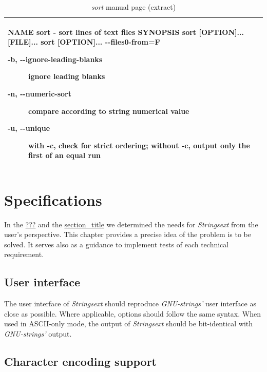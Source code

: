 \begin{longtable}[]{@{}l@{}}
\caption{\emph{sort} manual page (extract)}\tabularnewline
\toprule
\begin{minipage}[t]{0.97\columnwidth}\raggedright\strut
NAME sort - sort lines of text files SYNOPSIS sort {[}OPTION{]}...
{[}FILE{]}... sort {[}OPTION{]}... -\/-files0-from=F

\begin{description}
\item[-b, -\/-ignore-leading-blanks]
ignore leading blanks
\item[-n, -\/-numeric-sort]
compare according to string numerical value
\item[-u, -\/-unique]
with -c, check for strict ordering; without -c, output only the first of
an equal run
\end{description}\strut
\end{minipage}\tabularnewline
\bottomrule
\end{longtable}

\hypertarget{_specifications}{\section{Specifications}\label{_specifications}}

In the \protect\hyperlink{_tool_requirements_in_digital_forensics}{???}
and the
\protect\hyperlink{_requirements_derived_from_typical_usage}{section\_title}
we determined the needs for \emph{Strings­ext} from the user's
perspective. This chapter provides a precise idea of the problem is to
be solved. It serves also as a guidance to implement tests of each
technical requirement.

\hypertarget{user-interface}{\subsection{User
interface}\label{user-interface}}

The user interface of \emph{Strings­ext} should reproduce
\emph{GNU-strings'} user interface as close as possible. Where
applicable, options should follow the same syntax. When used in
ASCII-only mode, the output of \emph{Strings­ext} should be
bit-identical with \emph{GNU-strings'} output.

\hypertarget{character-encoding-support}{\subsection{Character encoding
support}\label{character-encoding-support}}

